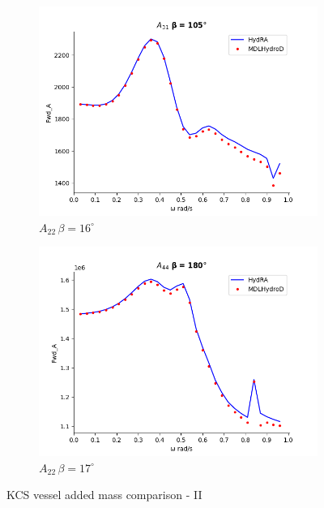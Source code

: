 \begin{figure}[H]
\begin{subfigure}[b]{0.45\textwidth}
        \includegraphics[width=\textwidth]{plots/kcs/added_mass/A31_BETA_105.png}
        \caption{$A_{22} \, \beta = 16^{\circ}$}
    \end{subfigure}
    \begin{subfigure}[b]{0.45\textwidth}
        \includegraphics[width=\textwidth]{plots/kcs/added_mass/A44_BETA_180.png}
        \caption{$A_{22} \, \beta = 17^{\circ}$}
    \end{subfigure}
    \caption{KCS vessel added mass comparison - II}
    \label{fig:kcs_addedmass_2}
\end{figure}

